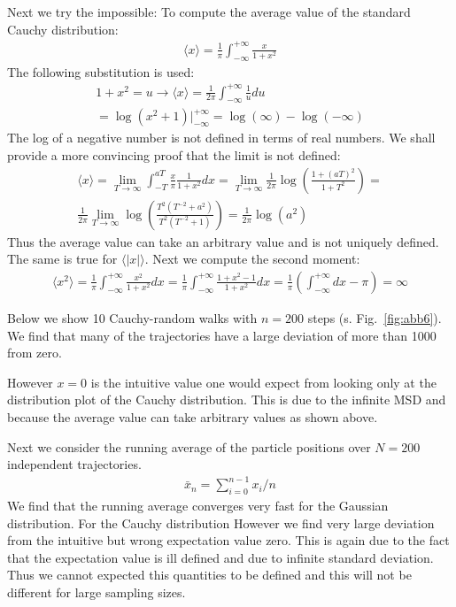 \documentclass[12pt]{article}
\begin{document}
Next we try the impossible: To compute the average value of the standard Cauchy distribution:
\begin{align}
  \langle x \rangle = \frac{1}{\pi}  \int_{-\infty}^{+\infty} \frac{x}{1+x^2}
\end{align}
The following substitution is used:
\begin{align}
  1+x^2 = u \rightarrow \langle x \rangle = \frac{1}{2 \pi} \int_{-\infty}^{+\infty}  \frac{1}{u} du \\
  =   \log(x^2+1) |_{-\infty}^{+\infty} = \log(\infty) - \log(-\infty)
\end{align}
The log of a negative number is not defined in terms of real numbers. We shall provide a more convincing proof
that the limit is not defined:
\begin{align}
  \langle x \rangle = 
  \lim_{T \rightarrow \infty} \int_{-T}^{aT} \frac{x}{\pi} \frac{1}{1+x^2} dx =
  \lim_{T \rightarrow \infty} \frac{1}{2 \pi} \log\left(\frac{1+(aT)^2}{1+T^2} \right) =  \\
  \frac{1}{2 \pi} \lim_{T \rightarrow \infty} 
   \log\left(  \frac{   T^{2} ( T^{-2}+a^2)}{ T^2 ( T^{-2} +1)} \right) =
   \frac{1}{ 2 \pi} \log(a^2)
\end{align}
Thus the average value can take an arbitrary value and is not uniquely defined.
The same is true for $ \langle | x |  \rangle $.
Next we compute the second moment:
\begin{align}
  \langle x^2 \rangle =\frac{1}{\pi} \int_{-\infty}^{+\infty} \frac{x^2}{1+x^2} dx =
  \frac{1}{\pi} \int_{-\infty}^{+\infty} \frac{1+x^2-1}{1+x^2} dx =
  \frac{1}{\pi} \left(\int_{-\infty}^{+\infty} dx - \pi \right) = \infty
\end{align}
 
Below we show 10 Cauchy-random walks with $n=200$ steps (s. Fig.~\ref{fig:abb6}). We find that many
of the trajectories have a large deviation of more than 1000 from zero.
 
However $x=0$ is the intuitive value one would expect from looking only at the distribution plot of the Cauchy distribution.
This is due to the infinite MSD and because the average value can take arbitrary values as shown above.
 
 
 

 
  Next we consider the running average of the particle positions over $N=200$ independent trajectories.
  \begin{align}
    \bar{x}_{n} = \sum_{i=0}^{n-1} x_{i}/n
  \end{align}
  We find that the running average converges very fast for the Gaussian distribution. For the 
  Cauchy distribution However we find very large deviation from the intuitive but wrong 
  expectation value zero. This is again due to the fact that the expectation value is ill defined
  and due to infinite standard deviation. Thus we cannot expected this quantities to be defined and
  this will not be different for large sampling sizes.
 
\end{document}
